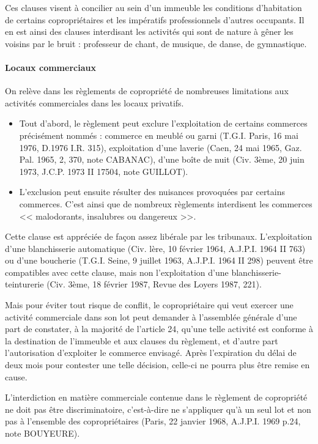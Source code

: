 				Ces clauses visent à concilier au sein d'un immeuble les conditions d'habitation de certains copropriétaires et les impératifs professionnels d'autres occupants. Il en est ainsi des clauses interdisant les activités qui sont de nature à gêner les voisins par le bruit : professeur de chant, de musique, de danse, de gymnastique.
			
			\paragraph{Locaux commerciaux}
			
				On relève dans les règlements de copropriété de nombreuses limitations aux activités commerciales dans les locaux privatifs.
				\begin{itemize}
					\item Tout d'abord, le règlement peut exclure l'exploitation de certains commerces précisément nommés : commerce en meublé ou garni (T.G.I. Paris, 16 mai 1976, D.1976 I.R. 315), exploitation d'une laverie (Caen, 24 mai 1965, Gaz. Pal. 1965, 2, 370, note CABANAC), d'une boîte de nuit (Civ. 3ème, 20 juin 1973, J.C.P. 1973 II 17504, note GUILLOT).
					\item L'exclusion peut ensuite résulter des nuisances provoquées par certains commerces. C'est ainsi que de nombreux règlements interdisent les commerces << malodorants, insalubres ou dangereux >>. 
				\end{itemize}
				
				Cette clause est appréciée de façon assez libérale par les tribunaux. L'exploitation d'une blanchisserie automatique (Civ. lère, 10 février 1964, A.J.P.I. 1964 II 763) ou d'une boucherie (T.G.I. Seine, 9 juillet 1963, A.J.P.I. 1964 II 298) peuvent être compatibles avec cette clause, mais non l’exploitation d’une blanchisserie-teinturerie (Civ. 3ème, 18 février 1987, Revue des Loyers 1987, 221).
		
				Mais pour éviter tout risque de conflit, le copropriétaire qui veut exercer une activité commerciale dans son lot peut demander à l'assemblée générale d'une part de constater, à la majorité de l'article 24, qu'une telle activité est conforme à la destination de l'immeuble et aux clauses du règlement, et d'autre part l'autorisation d'exploiter le commerce envisagé. Après l'expiration du délai de deux mois pour contester une telle décision, celle-ci ne pourra plus être remise en cause.
				
				L'interdiction en matière commerciale contenue dans le règlement de copropriété ne doit pas être discriminatoire, c'est-à-dire ne s'appliquer qu'à un seul lot et non pas à l'ensemble des copropriétaires (Paris, 22 janvier 1968, A.J.P.I. 1969 p.24, note BOUYEURE).
				
